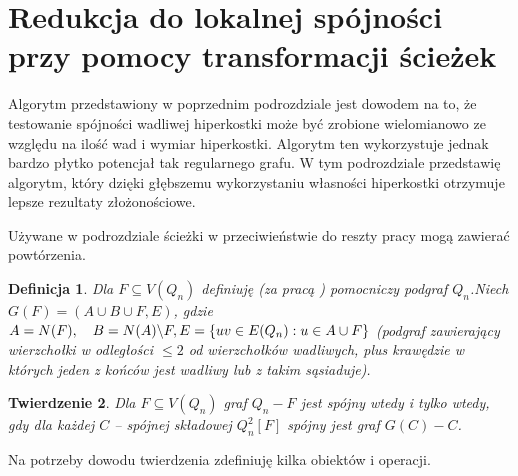 \documentclass{pracamgr}
\newtheorem{theorem}{Twierdzenie}[chapter]
\newtheorem{defi}[theorem]{Definicja}
\begin{document}
  \section{Redukcja do lokalnej spójności przy pomocy transformacji ścieżek}\label{spojnosc 2}
   Algorytm przedstawiony w poprzednim podrozdziale jest dowodem na to, że testowanie spójności wadliwej hiperkostki może być zrobione wielomianowo
   ze względu na ilość wad i wymiar hiperkostki. Algorytm ten wykorzystuje jednak bardzo płytko potencjał tak regularnego grafu.
   W tym podrozdziale przedstawię algorytm, który dzięki głębszemu wykorzystaniu własności hiperkostki otrzymuje lepsze rezultaty złożonościowe.
   
   Używane w podrozdziale ścieżki w przeciwieństwie do reszty pracy mogą zawierać powtórzenia. 
   \begin{defi}\label{podgrafy kostki}
    Dla $F\subseteq V(Q_n)$ definiuję (za pracą \cite{DFGKR}) pomocniczy podgraf $Q_n$.\newline Niech $G(F)=(A\cup B\cup F,E)$,
    gdzie $A=N(F),\quad B=N(A)\backslash F,\newline E=\{uv\in E(Q_n):u\in A\cup F\}$ (podgraf zawierający wierzchołki w odległości $\le 2$ od wierzchołków wadliwych,
    plus krawędzie w których jeden z końców jest wadliwy lub z takim sąsiaduje).
   \end{defi}
   \begin{theorem}\label{spojnosc z lokalnej spojnosci}
    Dla $F\subseteq V(Q_n)$ graf $Q_n-F$ jest spójny wtedy i tylko wtedy, gdy dla każdej $C$ -- spójnej składowej $Q_n^2[F]$ spójny jest graf $G(C)-C$.
   \end{theorem}
   Na potrzeby dowodu twierdzenia zdefiniuję kilka obiektów i operacji.
\end{document}
